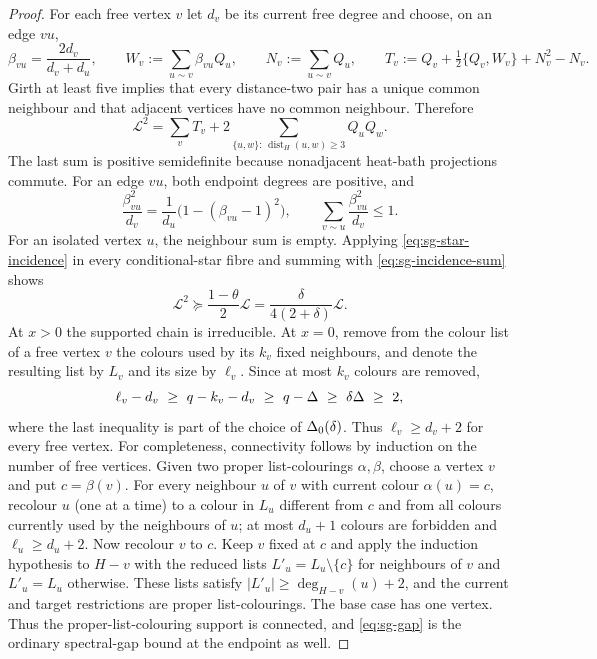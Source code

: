 \begin{proof}
For each free vertex $v$ let $d_v$ be its current free degree and choose, on
an edge $vu$,
\[
 \beta_{vu}=\frac{2d_v}{d_v+d_u},\qquad
 W_v:=\sum_{u\sim v}\beta_{vu}Q_u,\qquad
 N_v:=\sum_{u\sim v}Q_u,\qquad
 T_v:=Q_v+\tfrac12\{Q_v,W_v\}+N_v^2-N_v.
\]
Girth at least five implies that every distance-two pair has a unique common
neighbour and that adjacent vertices have no common neighbour.  Therefore
\begin{equation}\label{eq:sg-global-decomposition}
 \mathcal L^2=\sum_vT_v+2\sum_{\{u,w\}:\,\operatorname{dist}_H(u,w)\ge3}Q_uQ_w.
\end{equation}
The last sum is positive semidefinite because nonadjacent heat-bath
projections commute.  For an edge $vu$, both endpoint degrees are
positive, and
\begin{equation}\label{eq:sg-incidence-sum}
 \frac{\beta_{vu}^2}{d_v}=\frac{1}{d_u}\bigl(1-(\beta_{vu}-1)^2\bigr),
 \qquad \sum_{v\sim u}\frac{\beta_{vu}^2}{d_v}\le1.
\end{equation}
For an isolated vertex $u$, the neighbour sum is empty.
Applying \eqref{eq:sg-star-incidence} in every conditional-star fibre and summing with \eqref{eq:sg-incidence-sum}
shows
\[
 \mathcal L^2\succeq \frac{1-\theta}{2}\mathcal L
 =\frac{\delta}{4(2+\delta)}\mathcal L.
\]
At $x>0$ the supported chain is irreducible. At $x=0$, remove from the
colour list of a free vertex $v$ the colours used by its $k_v$ fixed
neighbours, and denote the resulting list by $L_v$ and its size by
$\ell_v$.  Since at most
$k_v$ colours are removed,
\[
 \ell_v-d_v\ \ge\ q-k_v-d_v
 \ \ge\ q-\Deg
 \ \ge\ \delta\Deg\ \ge\ 2,
\]
where the last inequality is part of the choice of $\Delta_0(\delta)$.
Thus $\ell_v\ge d_v+2$ for every free vertex.  For completeness,
connectivity follows by induction on the number of free vertices.  Given
two proper list-colourings $\alpha,\beta$, choose a vertex $v$ and put
$c=\beta(v)$.  For every neighbour $u$ of $v$ with current colour
$\alpha(u)=c$, recolour $u$ (one at a time) to a colour in $L_u$ different
from $c$ and from all colours currently used by the neighbours of $u$;
at most $d_u+1$ colours are forbidden and $\ell_u\ge d_u+2$.  Now recolour
$v$ to $c$.  Keep $v$ fixed at $c$ and apply the induction hypothesis to
$H-v$ with the reduced lists
$L'_u=L_u\setminus\{c\}$ for neighbours of $v$ and $L'_u=L_u$ otherwise.
These lists satisfy $|L'_u|\ge\deg_{H-v}(u)+2$, and the current and target
restrictions are proper list-colourings.  The base case has one vertex.
Thus the proper-list-colouring support is connected, and
\eqref{eq:sg-gap} is the ordinary spectral-gap bound at the endpoint as well.
\end{proof}
